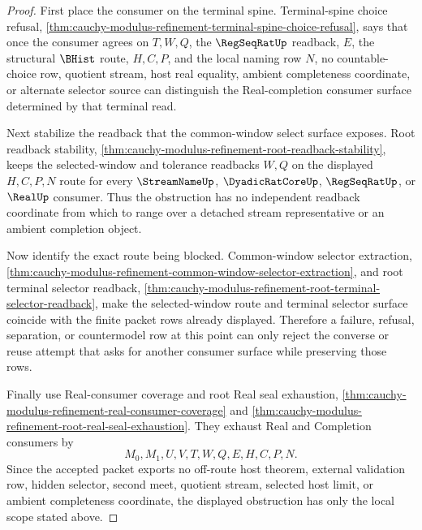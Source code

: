 \begin{proof}
First place the consumer on the terminal spine. Terminal-spine choice refusal, \autoref{thm:cauchy-modulus-refinement-terminal-spine-choice-refusal}, says that once the consumer agrees on $T,W,Q$, the $\RegSeqRatUp$ readback, $E$, the structural $\BHist$ route, $H,C,P$, and the local naming row $N$, no countable-choice row, quotient stream, host real equality, ambient completeness coordinate, or alternate selector source can distinguish the Real-completion consumer surface determined by that terminal read.

Next stabilize the readback that the common-window select surface exposes. Root readback stability, \autoref{thm:cauchy-modulus-refinement-root-readback-stability}, keeps the selected-window and tolerance readbacks $W,Q$ on the displayed $H,C,P,N$ route for every $\StreamNameUp$, $\DyadicRatCoreUp$, $\RegSeqRatUp$, or $\RealUp$ consumer. Thus the obstruction has no independent readback coordinate from which to range over a detached stream representative or an ambient completion object.

Now identify the exact route being blocked. Common-window selector extraction, \autoref{thm:cauchy-modulus-refinement-common-window-selector-extraction}, and root terminal selector readback, \autoref{thm:cauchy-modulus-refinement-root-terminal-selector-readback}, make the selected-window route and terminal selector surface coincide with the finite packet rows already displayed. Therefore a failure, refusal, separation, or countermodel row at this point can only reject the converse or reuse attempt that asks for another consumer surface while preserving those rows.

Finally use Real-consumer coverage and root Real seal exhaustion, \autoref{thm:cauchy-modulus-refinement-real-consumer-coverage} and \autoref{thm:cauchy-modulus-refinement-root-real-seal-exhaustion}. They exhaust Real and Completion consumers by
$$
M_0,M_1,U,V,T,W,Q,E,H,C,P,N.
$$
Since the accepted packet exports no off-route host theorem, external validation row, hidden selector, second meet, quotient stream, selected host limit, or ambient completeness coordinate, the displayed obstruction has only the local scope stated above.
\end{proof}
